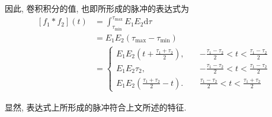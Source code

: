 因此, 卷积积分的值, 也即所形成的脉冲的表达式为
\begin{align}
    \nonumber [f_1*f_2](t) & =\int_{\tau_\mathrm{min}}^{\tau_\mathrm{max}}E_1E_2\mathrm{d}\tau                                                      \\
    \nonumber              & =E_1E_2(\tau_\mathrm{max}-\tau_\mathrm{min})                                                                           \\
                           & =\begin{cases}
                                  \displaystyle
                                  E_1E_2\left(t+\frac{\tau_1+\tau_2}{2}\right),\quad & \displaystyle -\frac{\tau_1-\tau_2}{2}<t<\frac{\tau_1-\tau_2}{2} \\
                                  \displaystyle
                                  E_1E_2\tau_2,\quad                                 & \displaystyle -\frac{\tau_1-\tau_2}{2}<t<\frac{\tau_1-\tau_2}{2} \\
                                  \displaystyle
                                  E_1E_2\left(\frac{\tau_1+\tau_2}{2}-t\right).\quad & \displaystyle \frac{\tau_1-\tau_2}{2}<t<\frac{\tau_1+\tau_2}{2}
                              \end{cases}
\end{align}

显然, 表达式上所形成的脉冲符合上文所述的特征.

